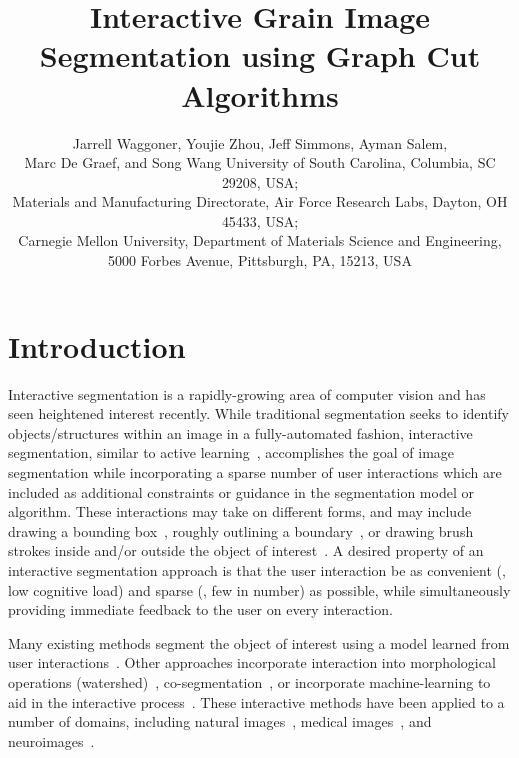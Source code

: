 \documentclass[]{spie}  %
\title{Interactive Grain Image Segmentation using Graph Cut Algorithms}
\author{Jarrell Waggoner\supit{a}, Youjie Zhou\supit{a}, Jeff Simmons\supit{b}, Ayman Salem\supit{b}, \\ Marc De Graef\supit{c}, and Song Wang\supit{a}
\skiplinehalf
\supit{a}University of South Carolina, Columbia, SC 29208, USA; \\
\supit{b}Materials and Manufacturing Directorate, Air Force Research
Labs, Dayton, OH 45433, USA; \\
\supit{c} Carnegie Mellon University, Department of Materials Science and Engineering, 5000 Forbes Avenue, Pittsburgh, PA, 15213, USA
}
\begin{document}
 
  \maketitle 

\begin{abstract}
% 

\end{abstract}




\section{Introduction}
\label{sec:intro}

Interactive segmentation is a rapidly-growing area of computer vision
and has seen heightened interest recently\cite{kuang:12,straehle:12}.
While traditional segmentation seeks to identify objects/structures
within an image in a fully-automated fashion, interactive
segmentation, similar to active learning~\cite{settles:09},
accomplishes the goal of image segmentation while incorporating a
sparse number of user interactions which are included as additional
constraints or guidance in the segmentation model or algorithm.
These interactions may take on different forms, and may include
drawing a bounding box~\cite{rother:04}, roughly outlining a
boundary~\cite{mortensen:95}, or drawing brush strokes inside and/or
outside the object of interest~\cite{santner:10, unger:08, boykov:01b,
  vezhnevets:95}.  A desired property of an interactive segmentation
approach is that the user interaction be as convenient (\ie, low
cognitive load) and sparse (\ie, few in number) as possible, while
simultaneously providing immediate feedback to the user on every
interaction.

Many existing methods segment the object of interest using a model
learned from user interactions~\cite{boykov:01b, unger:08, rother:04}.
Other approaches incorporate interaction into morphological operations
(watershed)~\cite{straehle:12}, co-segmentation~\cite{batra:10}, or
incorporate machine-learning to aid in the interactive
process~\cite{top:11, kuang:12}.  These interactive methods have been
applied to a number of domains, including natural
images~\cite{rother:04}, medical images~\cite{boykov:00}, and
neuroimages~\cite{straehle:11, straehle:12}.
\end{document}
